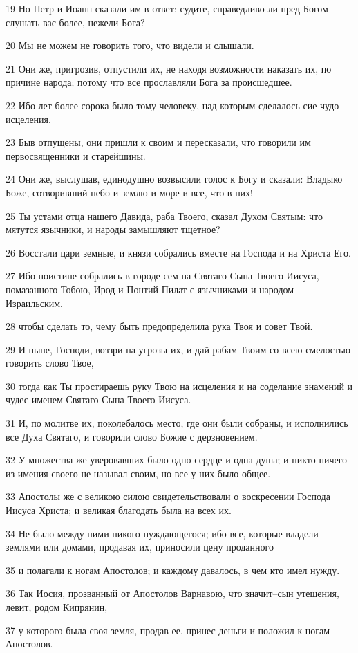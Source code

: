 \par 19 Но Петр и Иоанн сказали им в ответ: судите, справедливо ли пред Богом слушать вас более, нежели Бога?
\par 20 Мы не можем не говорить того, что видели и слышали.
\par 21 Они же, пригрозив, отпустили их, не находя возможности наказать их, по причине народа; потому что все прославляли Бога за происшедшее.
\par 22 Ибо лет более сорока было тому человеку, над которым сделалось сие чудо исцеления.
\par 23 Быв отпущены, они пришли к своим и пересказали, что говорили им первосвященники и старейшины.
\par 24 Они же, выслушав, единодушно возвысили голос к Богу и сказали: Владыко Боже, сотворивший небо и землю и море и все, что в них!
\par 25 Ты устами отца нашего Давида, раба Твоего, сказал Духом Святым: что мятутся язычники, и народы замышляют тщетное?
\par 26 Восстали цари земные, и князи собрались вместе на Господа и на Христа Его.
\par 27 Ибо поистине собрались в городе сем на Святаго Сына Твоего Иисуса, помазанного Тобою, Ирод и Понтий Пилат с язычниками и народом Израильским,
\par 28 чтобы сделать то, чему быть предопределила рука Твоя и совет Твой.
\par 29 И ныне, Господи, воззри на угрозы их, и дай рабам Твоим со всею смелостью говорить слово Твое,
\par 30 тогда как Ты простираешь руку Твою на исцеления и на соделание знамений и чудес именем Святаго Сына Твоего Иисуса.
\par 31 И, по молитве их, поколебалось место, где они были собраны, и исполнились все Духа Святаго, и говорили слово Божие с дерзновением.
\par 32 У множества же уверовавших было одно сердце и одна душа; и никто ничего из имения своего не называл своим, но все у них было общее.
\par 33 Апостолы же с великою силою свидетельствовали о воскресении Господа Иисуса Христа; и великая благодать была на всех их.
\par 34 Не было между ними никого нуждающегося; ибо все, которые владели землями или домами, продавая их, приносили цену проданного
\par 35 и полагали к ногам Апостолов; и каждому давалось, в чем кто имел нужду.
\par 36 Так Иосия, прозванный от Апостолов Варнавою, что значит--сын утешения, левит, родом Кипрянин,
\par 37 у которого была своя земля, продав ее, принес деньги и положил к ногам Апостолов.

